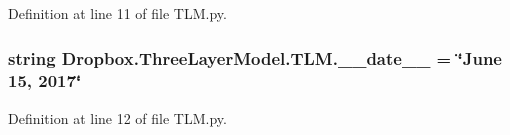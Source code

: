 Definition at line 11 of file T\+L\+M.\+py.

\hypertarget{namespaceDropbox_1_1ThreeLayerModel_1_1TLM_acb56f878d10cf152582aaafd07a8510e}{
\subsubsection[{\+\_\+\+\_\+date\+\_\+\+\_\+}]{\setlength{\rightskip}{0pt plus 5cm}string Dropbox.\+Three\+Layer\+Model.\+T\+L\+M.\+\_\+\+\_\+date\+\_\+\+\_\+ = \char`\"{}June 15, 2017\char`\"{}}}\label{namespaceDropbox_1_1ThreeLayerModel_1_1TLM_acb56f878d10cf152582aaafd07a8510e}


Definition at line 12 of file T\+L\+M.\+py.

